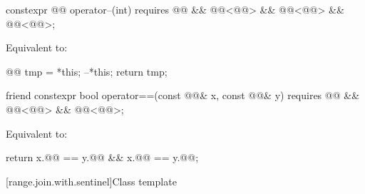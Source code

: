 %
\begin{itemdecl}
constexpr @@ operator--(int)
  requires @@ && @@<@@> &&
           @@<@@> && @@<@@>;
\end{itemdecl}

\begin{itemdescr}
\pnum
\effects
Equivalent to:
\begin{codeblock}
@@ tmp = *this;
--*this;
return tmp;
\end{codeblock}
\end{itemdescr}

%
\begin{itemdecl}
friend constexpr bool operator==(const @@& x, const @@& y)
  requires @@ && @@<@@> &&
           @@<@@>;
\end{itemdecl}

\begin{itemdescr}
\pnum
\effects
Equivalent to:
\begin{codeblock}
return x.@@ == y.@@ && x.@@ == y.@@;
\end{codeblock}
\end{itemdescr}

[range.join.with.sentinel]{Class template }

